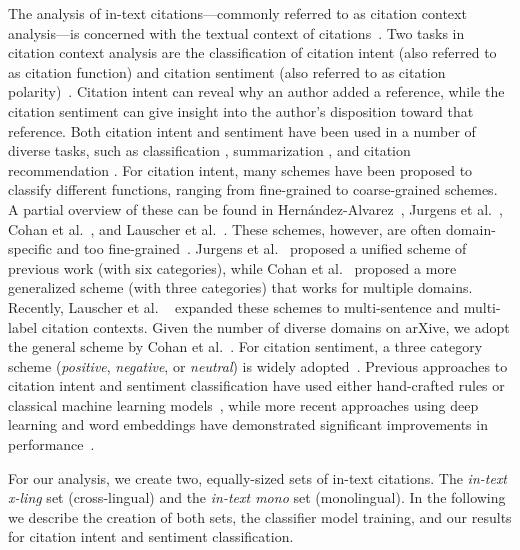 The analysis of in-text citations---commonly referred to as citation context analysis---is concerned with the textual context of citations~\cite{Hernandez2016}. Two tasks in citation context analysis are the classification of citation intent (also referred to as citation function) and citation sentiment (also referred to as citation polarity)~\cite{Hernandez2016}. Citation intent can reveal why an author added a reference, while the citation sentiment can give insight into the author's disposition toward that reference. Both citation intent and sentiment have been used in a number of diverse tasks, such as classification \cite{Jurgens2018,Cohan2019,Beltagy2019}, summarization \cite{Cohan2015}, and citation recommendation \cite{Faerber202x}. For citation intent, many schemes have been proposed to classify different functions, ranging from fine-grained to coarse-grained schemes. A partial overview of these can be found in Hernández-Alvarez~\cite{Hernandez2016}, Jurgens et al.~\cite{Jurgens2018}, Cohan et al.~\cite{Cohan2019}, and Lauscher et al.~\cite{multicite-lauscher-2021}. These schemes, however, are often domain-specific and too fine-grained~\cite{Cohan2019}. Jurgens et al.~\cite{Jurgens2018} proposed a unified scheme of previous work (with six categories), while Cohan et al.~\cite{Cohan2019} proposed a more generalized scheme (with three categories) that works for multiple domains. Recently, Lauscher et al. ~\cite{multicite-lauscher-2021} expanded these schemes to multi-sentence and multi-label citation contexts. Given the number of diverse domains on arXive, we adopt the general scheme by Cohan et al.~\cite{Cohan2019}. For citation sentiment, a three category scheme (\textit{positive}, \textit{negative}, or \textit{neutral}) is widely adopted~\cite{Athar2011,Abujbara2013,Hernandez2016}. Previous approaches to citation intent and sentiment classification have used either hand-crafted rules or classical machine learning models~\cite{Abujbara2013,Jurgens2018}, while more recent approaches using deep learning and word embeddings have demonstrated significant improvements in performance~\cite{Cohan2019,Beltagy2019,multicite-lauscher-2021}.

For our analysis, we create two, equally-sized sets of in-text citations. The \textit{in-text x-ling} set (cross-lingual) and the \textit{in-text mono} set (monolingual). In the following we describe the creation of both sets, the classifier model training, and our results for citation intent and sentiment classification.

